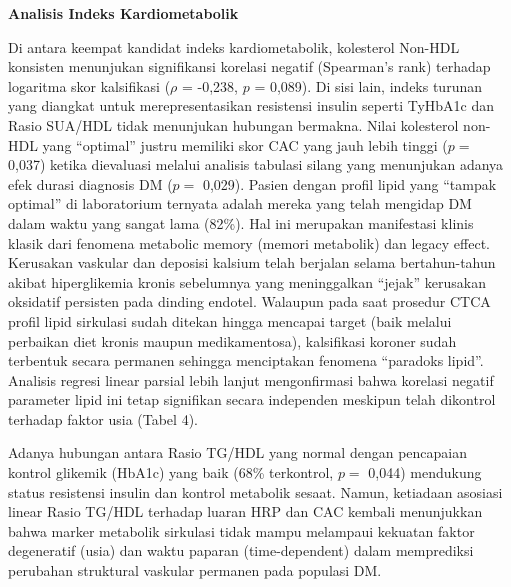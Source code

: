 \documentclass[
  indonesian,
]{agujournal2019}
\begin{document}
\textbf{Analisis Indeks Kardiometabolik}

Di antara keempat kandidat indeks kardiometabolik, kolesterol Non-HDL
konsisten menunjukan signifikansi korelasi negatif (Spearman's rank)
terhadap logaritma skor kalsifikasi (\(\rho\) = -0,238, \(p\) = 0,089).
Di sisi lain, indeks turunan yang diangkat untuk merepresentasikan
resistensi insulin seperti TyHbA1c dan Rasio SUA/HDL tidak menunjukan
hubungan bermakna. Nilai kolesterol non-HDL yang ``optimal'' justru
memiliki skor CAC yang jauh lebih tinggi (\(p =\) 0,037) ketika
dievaluasi melalui analisis tabulasi silang yang menunjukan adanya efek
durasi diagnosis DM (\(p =\) 0,029). Pasien dengan profil lipid yang
``tampak optimal'' di laboratorium ternyata adalah mereka yang telah
mengidap DM dalam waktu yang sangat lama (82\%). Hal ini merupakan
manifestasi klinis klasik dari fenomena metabolic memory (memori
metabolik) dan legacy effect. Kerusakan vaskular dan deposisi kalsium
telah berjalan selama bertahun-tahun akibat hiperglikemia kronis
sebelumnya yang meninggalkan ``jejak'' kerusakan oksidatif persisten
pada dinding endotel. Walaupun pada saat prosedur CTCA profil lipid
sirkulasi sudah ditekan hingga mencapai target (baik melalui perbaikan
diet kronis maupun medikamentosa), kalsifikasi koroner sudah terbentuk
secara permanen sehingga menciptakan fenomena ``paradoks lipid''.
Analisis regresi linear parsial lebih lanjut mengonfirmasi bahwa
korelasi negatif parameter lipid ini tetap signifikan secara independen
meskipun telah dikontrol terhadap faktor usia (Tabel 4).

Adanya hubungan antara Rasio TG/HDL yang normal dengan pencapaian
kontrol glikemik (HbA1c) yang baik (68\% terkontrol, \(p =\) 0,044)
mendukung status resistensi insulin dan kontrol metabolik sesaat. Namun,
ketiadaan asosiasi linear Rasio TG/HDL terhadap luaran HRP dan CAC
kembali menunjukkan bahwa marker metabolik sirkulasi tidak mampu
melampaui kekuatan faktor degeneratif (usia) dan waktu paparan
(time-dependent) dalam memprediksi perubahan struktural vaskular
permanen pada populasi DM.
\end{document}
